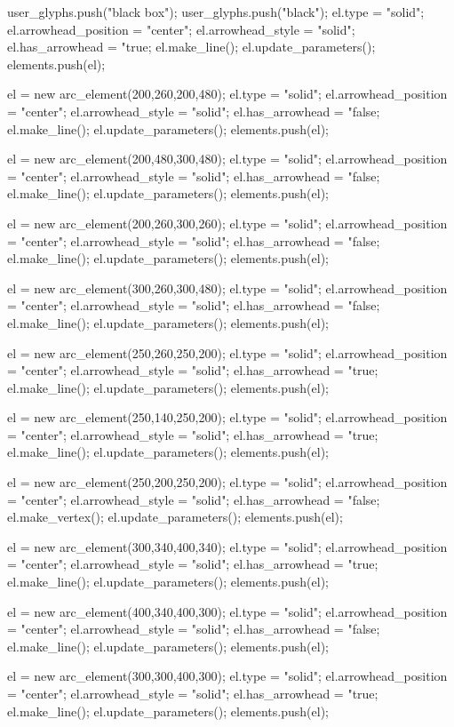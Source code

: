 user_glyphs.push("black box");
user_glyphs.push("black");
el.type = "solid";
el.arrowhead_position = "center";
el.arrowhead_style = "solid";
el.has_arrowhead = "true;
el.make_line();
el.update_parameters();
elements.push(el);

el = new arc_element(200,260,200,480);
el.type = "solid";
el.arrowhead_position = "center";
el.arrowhead_style = "solid";
el.has_arrowhead = "false;
el.make_line();
el.update_parameters();
elements.push(el);

el = new arc_element(200,480,300,480);
el.type = "solid";
el.arrowhead_position = "center";
el.arrowhead_style = "solid";
el.has_arrowhead = "false;
el.make_line();
el.update_parameters();
elements.push(el);

el = new arc_element(200,260,300,260);
el.type = "solid";
el.arrowhead_position = "center";
el.arrowhead_style = "solid";
el.has_arrowhead = "false;
el.make_line();
el.update_parameters();
elements.push(el);

el = new arc_element(300,260,300,480);
el.type = "solid";
el.arrowhead_position = "center";
el.arrowhead_style = "solid";
el.has_arrowhead = "false;
el.make_line();
el.update_parameters();
elements.push(el);

el = new arc_element(250,260,250,200);
el.type = "solid";
el.arrowhead_position = "center";
el.arrowhead_style = "solid";
el.has_arrowhead = "true;
el.make_line();
el.update_parameters();
elements.push(el);

el = new arc_element(250,140,250,200);
el.type = "solid";
el.arrowhead_position = "center";
el.arrowhead_style = "solid";
el.has_arrowhead = "true;
el.make_line();
el.update_parameters();
elements.push(el);

el = new arc_element(250,200,250,200);
el.type = "solid";
el.arrowhead_position = "center";
el.arrowhead_style = "solid";
el.has_arrowhead = "false;
el.make_vertex();
el.update_parameters();
elements.push(el);

el = new arc_element(300,340,400,340);
el.type = "solid";
el.arrowhead_position = "center";
el.arrowhead_style = "solid";
el.has_arrowhead = "true;
el.make_line();
el.update_parameters();
elements.push(el);

el = new arc_element(400,340,400,300);
el.type = "solid";
el.arrowhead_position = "center";
el.arrowhead_style = "solid";
el.has_arrowhead = "false;
el.make_line();
el.update_parameters();
elements.push(el);

el = new arc_element(300,300,400,300);
el.type = "solid";
el.arrowhead_position = "center";
el.arrowhead_style = "solid";
el.has_arrowhead = "true;
el.make_line();
el.update_parameters();
elements.push(el);

